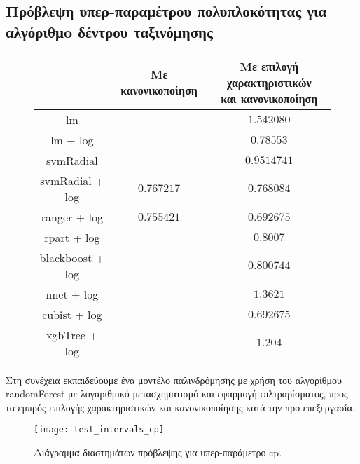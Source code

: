 \subsection{Πρόβλεψη υπερ-παραμέτρου πολυπλοκότητας για αλγόριθμo δέντρου ταξινόμησης} 
\begin{figure}[!htb]
	\footnotesize
	\begin{center}
		\begin{tabular}{ |c|c|c| } 
			\hline
			 & Με κανονικοποίηση & \pbox{20cm}{Με επιλογή χαρακτηριστικών\\ και κανονικοποίηση} \\
			 \hline
			lm & & $1.542080$  \\
			\hline
			lm + log && $0.78553$\\
			\hline
			svmRadial && $0.9514741$\\
			\hline
			svmRadial + log& $0.767217$& $0.768084$\\
			\hline
			ranger + log  &$0.755421$&$0.692675$\\
			\hline
			rpart + log &&$0.8007$\\
			\hline
			blackboost + log && $0.800744$ \\
			\hline
			nnet + log  && $1.3621$\\
			\hline
			cubist + log && $0.692675$ \\
			\hline
			xgbTree + log && $1.204$\\
			\hline
		\end{tabular}   
	\end{center}
\end{figure}

Στη συνέχεια εκπαιδεύουμε ένα μοντέλο παλινδρόμησης με χρήση του αλγορίθμου randomForest με λογαριθμικό μετασχηματισμό και εφαρμογή φιλτραρίσματος, προς-τα-εμπρός επιλογής χαρακτηριστικών και κανονικοποίησης κατά την προ-επεξεργασία.

\begin{figure}[!htb]
	\texttt{[image: test\_intervals\_cp]}
			\caption[Διάγραμμα διαστημάτων πρόβλεψης για υπερ-παράμετρο decay]{Διάγραμμα διαστημάτων πρόβλεψης για υπερ-παράμετρο cp.}
	\label{fig:high} 
\end{figure}
\FloatBarrier
